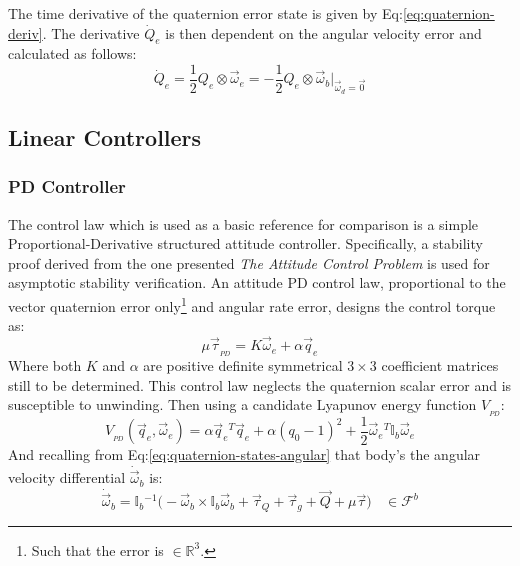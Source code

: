 The time derivative of the quaternion error state is given by Eq:\ref{eq:quaternion-deriv}. The derivative $\dot{Q}_e$ is then dependent on the angular velocity error and calculated as follows:
\begin{equation}
\dot{Q}_e=\frac{1}{2}Q_e\otimes\vec{\omega}_e=-\frac{1}{2}Q_e\otimes\vec{\omega}_b\Big|_{\vec{\omega}_d=\vec{0}}
\end{equation}
\subsection{Linear Controllers}
\label{subsec:control.attitude.controllers}
\subsubsection{PD Controller}
\label{subsubsec:control.attitude.controllers.pd}
The control law which is used as a basic reference for comparison is a simple Proportional-Derivative structured attitude controller. Specifically, a stability proof derived from the one presented \emph{The Attitude Control Problem}\cite{attitudecontrolproblem} is used for asymptotic stability verification. An attitude PD control law, proportional to the vector quaternion error only\footnote{Such that the error is $\in\mathbb{R}^3$.} and angular rate error, designs the control torque as:
\begin{equation}\label{eq:independent-pd}
\mu\vec{\tau}_{_{PD}}=K\vec{\omega}_e+\alpha\vec{q}_e
\end{equation}
Where both $K$ and $\alpha$ are positive definite symmetrical $3\times 3$ coefficient matrices still to be determined. This control law neglects the quaternion scalar error and is susceptible to unwinding. Then using a candidate Lyapunov energy function $V_{_{PD}}$:
\begin{equation}\label{eq:lyapunov-pd}
V_{_{PD}}(\vec{q}_e,\vec{\omega}_e)=\alpha\vec{q}_e\text{}^T\vec{q}_e+\alpha(q_0-1)^2+\frac{1}{2}\vec{\omega}_e\text{}^T\mathbb{I}_b\vec{\omega}_e
\end{equation}
And recalling from Eq:\ref{eq:quaternion-states-angular} that body's the angular velocity differential $\dot{\vec{\omega}}_b$ is:
\begin{equation}
\dot{\vec{\omega}}_b=\mathbb{I}_b\text{}^{-1}\big(-\vec{\omega}_b\times\mathbb{I}_b\vec{\omega}_b+\vec{\tau}_Q+\vec{\tau}_g+\vec{Q}+\mu\vec{\tau}\big)~~~~\in\mathcal{F}^b
\end{equation}
